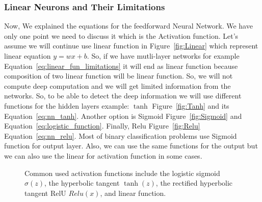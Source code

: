 \subsubsection{Linear Neurons and Their Limitations}

Now, We explained the equations for the feedforward Neural Network. We have only one point we need to discuss it which is the Activation function. Let's assume we will continue use linear function in Figure~\ref{fig:Linear} which represent linear equation  $y= w x + b$. So, if we have mutli-layer networks for example Equation~\eqref{eq:linear_fun_limitations} it will end as linear function because composition of two linear function will be linear function. So, we will not compute deep computation and we will get limited information from the networks. So, to be able to detect the deep information we will use different functions for the hidden layers example: $\tanh$ Figure~\ref{fig:Tanh} and its Equation~\eqref{eq:nn_tanh}. Another option is Sigmoid Figure~\ref{fig:Sigmoid} and  Equation~\eqref{eq:logistic_function}. Finally, Relu Figure~\ref{fig:Relu} Equation~\eqref{eq:nn_relu}. Most of binary classification problems use Sigmoid function for output layer. Also, we can use the same functions for the output but we can also use the linear for activation function in some cases.%
\begin{figure}[!t]
  \centering
%
%          
%
          \caption{Common used activation functions include the logistic sigmoid $\sigma(z)$, the hyperbolic tangent $\tanh(z)$, the rectified hyperbolic tangent RelU $Relu(x)$, and linear function.}
\end{figure}%
